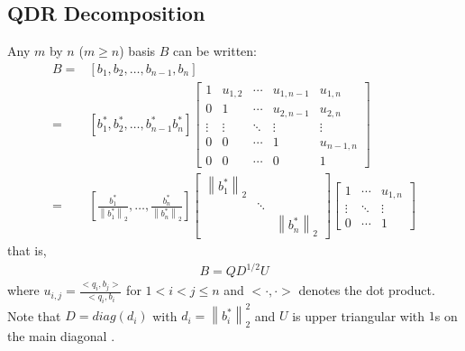 \documentclass[12pt]{article}
\numberwithin{equation}{section}
\numberwithin{table}{section}
\numberwithin{figure}{section}
\newcommand{\norm}[1]{\left\lVert#1\right\rVert}
\begin{document}
\subsection{QDR Decomposition}
Any $m$ by $n$ ($m \geq n$) basis $B$ can be written:
\begin{align*}
B=&\left[b_1,b_2,\ldots,b_{n-1},b_n\right]\\
 =&\left[b^*_1,b^*_2,\ldots,b^*_{n-1}b^*_n\right]
	\left[ \begin{array}{ccccc}
		1 & u_{1,2} & \cdots & u_{1,n-1} & u_{1,n} \\
		0 & 1       & \cdots & u_{2,n-1} & u_{2,n} \\
		\vdots & \vdots & \ddots & \vdots & \vdots \\
		0 & 0       & \cdots & 1 & u_{n-1,n}       \\
		0 & 0       & \cdots & 0 & 1               
	\end{array}\right]\\
 =&\left[\frac{b^*_1}{\norm{b^*_1}_2},\ldots,\frac{b^*_n}{\norm{b^*_n}_2}\right]
   \left[\begin{array}{ccc}
		\norm{b^*_1}_2  &  \\
		&  \ddots       &  \\
		&      &\norm{b^*_n}_2 
   \end{array}\right]
   \left[\begin{array}{ccc}
		1 & \cdots & u_{1,n} \\
		\vdots & \ddots & \vdots \\
		0 & \cdots & 1
   \end{array}\right]
\end{align*}
that is,
\begin{eqnarray}
B=QD^{1/2}U \label{decomp}
\end{eqnarray}
where $u_{i,j}=\frac{<q_i,b_j>}{<q_i,b_i}$ for $1 < i < j \leq n$ and $<\cdot,\cdot>$ denotes the dot product. Note that $D=diag(d_i)$ with $d_i=\norm{b^*_i}^2_2$ and $U$ is upper triangular with $1$s on the main diagonal \cite{LuoQiaoParallelLLL}.
\end{document}
